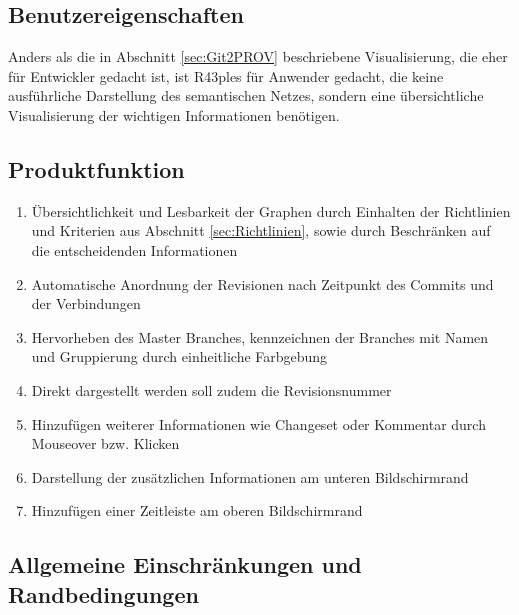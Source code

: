 \documentclass[color]{tudbook}
\begin{document}
\subsection{Benutzereigenschaften}
Anders als die in Abschnitt \ref{sec:Git2PROV} beschriebene Visualisierung, die eher für Entwickler gedacht ist, ist R43ples für Anwender gedacht, die keine ausführliche Darstellung des semantischen Netzes, sondern eine übersichtliche Visualisierung der wichtigen Informationen benötigen. 

\subsection{Produktfunktion}
\begin{enumerate}
\item Übersichtlichkeit und Lesbarkeit der Graphen durch Einhalten der Richtlinien und Kriterien aus Abschnitt \ref{sec:Richtlinien}, sowie durch Beschränken auf die entscheidenden Informationen
\item Automatische Anordnung der Revisionen nach Zeitpunkt des Commits und der Verbindungen
\item Hervorheben des Master Branches, kennzeichnen der Branches mit Namen und Gruppierung durch einheitliche Farbgebung
\item Direkt dargestellt werden soll zudem die Revisionsnummer
\item Hinzufügen weiterer Informationen wie Changeset oder Kommentar durch Mouseover bzw. Klicken
\item Darstellung der zusätzlichen Informationen am unteren Bildschirmrand
\item Hinzufügen einer Zeitleiste am oberen Bildschirmrand
\end{enumerate}

\subsection{Allgemeine Einschränkungen und Randbedingungen}
\end{document}
